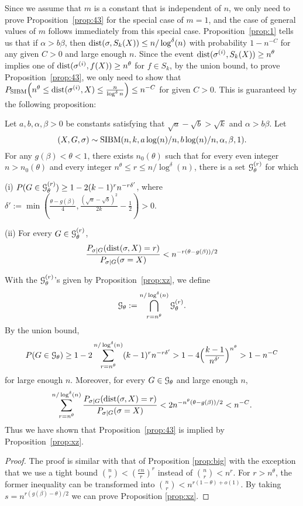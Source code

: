 \documentclass{article}
\begin{document}
Since we assume that $m$ is a constant that is independent of $n$,
we only need to prove Proposition~\ref{prop:43} for the special case of $m=1$, and the case of general values of $m$ follows immediately from this special case.
Proposition~\ref{prop:1} tells us that if $\alpha>b\beta$, then $\operatorname{dist}(\sigma,S_k(X)) \le n/\log^{\delta}(n)$
with probability $1-n^{-C}$ for any given $C>0$ and large enough $n$.
Since the event $\operatorname{dist}(\sigma^{(i)},S_k(X)) \geq n^{\theta}$ implies one of $\operatorname{dist}(\sigma^{(i)},f(X)) \geq n^{\theta}$ for $f\in S_k$,
by the union bound,
to prove Proposition~\ref{prop:43}, we only need to show that 
$P_{\operatorname{SIBM}} \Big(n^{\theta} \leq \operatorname{dist}(\sigma^{(i)},X) \leq \frac{n}{\log^{\delta} n}\Big) \leq n^{-C}$
for given $C>0$.
This is guaranteed by the following proposition:
\begin{proposition} \label{prop:xz}
Let $a,b,\alpha,\beta> 0$ be constants satisfying that $\sqrt{a}-\sqrt{b} > \sqrt{k}$ and $\alpha>b\beta$.
Let 
$$
(X,G,\sigma) \sim \operatorname{SIBM}(n, k, a\log(n)/n, b\log(n)/n,\alpha,\beta, 1) .
$$
For any $g(\beta)<\theta<1$, there exists $n_0(\theta)$ such that
for every even integer $n>n_0(\theta)$ and
every integer $n^{\theta} \le r \le n/\log^{\delta}(n)$,
there is a set $\mathcal{G}_{\theta}^{(r)}$ for which

\noindent (i)
$P(G\in\mathcal{G}_\theta^{(r)}) \ge 1- 2(k-1)^r n^{-r\delta'}$,
where $\delta':=\min(\frac{\theta - g(\beta)}{4},\frac{(\sqrt{a}-\sqrt{b})^2}{2k} - \frac{1}{2}) >0$.

\noindent (ii) For every $G\in\mathcal{G}_\theta^{(r)}$,
$$
\frac{P_{\sigma|G}(\operatorname{dist}(\sigma,X) = r )}
{P_{\sigma|G}(\sigma=X)} <
n^{-r (\theta - g(\beta)) /2}
$$
\end{proposition}
With the $\mathcal{G}_\theta^{(r)}$'s given by Proposition~\ref{prop:xz}, we
define 
$$
\mathcal{G}_\theta:=\bigcap_{r=n^{\theta}}^{n/\log^{\delta}(n)} \mathcal{G}_\theta^{(r)} .
$$
By the union bound,
$$
P(G\in\mathcal{G}_\theta)\ge 1-2 \sum_{r=n^{\theta}}^{n/\log^{\delta}(n)} (k-1)^rn^{-r\delta'}
> 1-4 \Big(\frac{k-1}{n^{\delta'}}\Big)^{n^\theta}
>1-n^{-C}
$$
for large enough $n$.
Moreover, for every $G\in\mathcal{G}_\theta$ and large enough $n$,
\begin{align*}
 \sum_{r=n^{\theta}}^{n/\log^{\delta}(n)}
\frac{P_{\sigma|G}(\operatorname{dist}(\sigma,X) = r )}
{P_{\sigma|G}(\sigma=X)}  < 2n^{-n^{\theta}(\theta - g(\beta))/2} < n^{-C} .
\end{align*}
Thus we have shown that Proposition~\ref{prop:43} is implied by Proposition~\ref{prop:xz}.
\begin{proof}
The proof is similar with that of Proposition \ref{prop:big} with the exception that we use a tight bound
$\binom{n}{r} < (\frac{en}{r})^r$ instead of $\binom{n}{r}< n^r$. For $r>n^{\theta}$, the former inequality
can be transformed into $\binom{n}{r} < n^{r(1-\theta) + o(1)}$. By taking $s=n^{r(g(\beta) - \theta)/2}$ we can prove
Proposition \ref{prop:xz}.
\end{proof}
\end{document}

